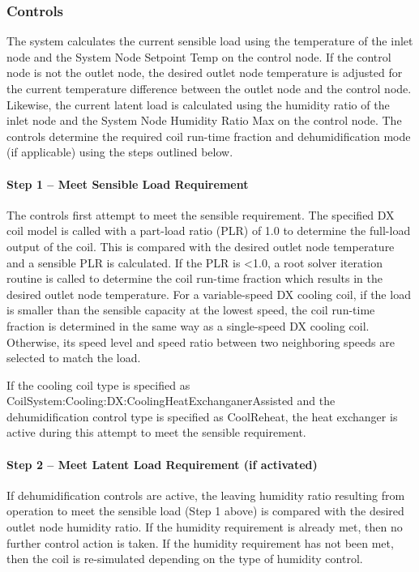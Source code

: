 \subsubsection{Controls}\label{controls-1}

The system calculates the current sensible load using the temperature of the inlet node and the System Node Setpoint Temp on the control node. If the control node is not the outlet node, the desired outlet node temperature is adjusted for the current temperature difference between the outlet node and the control node. Likewise, the current latent load is calculated using the humidity ratio of the inlet node and the System Node Humidity Ratio Max on the control node. The controls determine the required coil run-time fraction and dehumidification mode (if applicable) using the steps outlined below.

\paragraph{Step 1 -- Meet Sensible Load Requirement}\label{step-1-meet-sensible-load-requirement-1}

The controls first attempt to meet the sensible requirement. The specified DX coil model is called with a part-load ratio (PLR) of 1.0 to determine the full-load output of the coil. This is compared with the desired outlet node temperature and a sensible PLR is calculated. If the PLR is \textless{}1.0, a root solver iteration routine is called to determine the coil run-time fraction which results in the desired outlet node temperature. For a variable-speed DX cooling coil, if the load is smaller than the sensible capacity at the lowest speed, the coil run-time fraction is determined in the same way as a single-speed DX cooling coil. Otherwise, its speed level and speed ratio between two neighboring speeds are selected to match the load.

If the cooling coil type is specified as CoilSystem:Cooling:DX:CoolingHeatExchanganerAssisted and the dehumidification control type is specified as CoolReheat, the heat exchanger is active during this attempt to meet the sensible requirement.

\paragraph{Step 2 -- Meet Latent Load Requirement (if activated)}\label{step-2-meet-latent-load-requirement-if-activated-1}

If dehumidification controls are active, the leaving humidity ratio resulting from operation to meet the sensible load (Step 1 above) is compared with the desired outlet node humidity ratio. If the humidity requirement is already met, then no further control action is taken. If the humidity requirement has not been met, then the coil is re-simulated depending on the type of humidity control.

